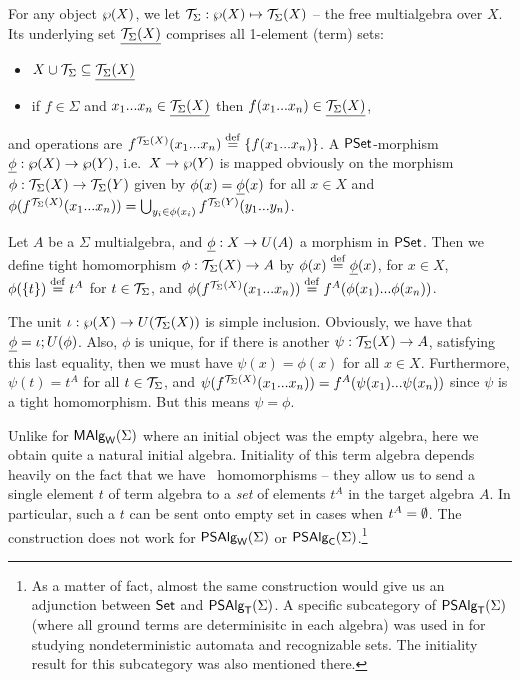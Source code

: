 \documentclass[10pt]{article}
\begin{document}
\begin{Proof}
For any object $\wp(X)$, we let ${\cal T}_{\Sigma}:\wp(X)\mapsto {\cal T}_{\Sigma}(X)$
-- the free multialgebra over $X$. Its underlying set $\underline {{\cal T}_{\Sigma}(X)}$ comprises all 1-element (term) sets:

\begin{itemize}\MyLPar
\item 
$X\cup{\cal T}_{\Sigma}\subseteq \underline {{\cal T}_{\Sigma}(X)}$ 
\item 
if $f\in\Sigma$ and $x_1...x_n\in\underline {{\cal T}_{\Sigma}(X)}$ then
$f(x_1...x_n)\in\underline {{\cal T}_{\Sigma}(X)}$,
\end{itemize}
%
and operations are $f^{{\cal T}_{\Sigma}(X)}(x_1...x_n)\stackrel{{\rm \tiny{def}}}= \{f(x_1...x_n)\}$.
A $\mbox{\rm\sf PSet}$-morphism $\underline {\phi}:\wp(X)\rightarrow\wp(Y)$, i.e.\ 
$X\rightarrow\wp(Y)$ is mapped obviously on the morphism
$\phi:{\cal T}_{\Sigma}(X)\rightarrow{\cal T}_{\Sigma}(Y)$ given by $\phi(x)=\underline {\phi}(x)$ for
all $x\in X$ and $\phi(f^{{\cal T}_{\Sigma}(X)}(x_1...x_n))=
\bigcup_{y_{i}\in\phi(x_{i})}f^{{\cal T}_{\Sigma}(Y)}(y_1...y_n)$.

Let $A$ be a $\Sigma$ multialgebra, and $\underline {\phi}:X\rightarrow U(A)$
a morphism in $\mbox{\rm\sf PSet}$. Then we define tight homomorphism $\phi
:{\cal T}_{\Sigma}(X)\rightarrow A$ by $\phi(x)\stackrel{{\rm \tiny{def}}}=\underline {\phi}(x)$, for $x\in X$,
$\phi(\{t\})\stackrel{{\rm \tiny{def}}}= t^A$ for $t\in{\cal T}_{\Sigma}$, and
$\phi(f^{{\cal T}_{\Sigma}(X)}(x_1...x_n))\stackrel{{\rm \tiny{def}}}= f^A(\phi(x_1)...\phi(x_n))$.

The unit $\iota:\wp(X)\rightarrow U({\cal T}_{\Sigma}(X))$ is simple
inclusion. Obviously, we have that $\underline {\phi} =
\iota;U(\phi)$. Also, $\phi$ is unique, for if there is
another $\psi:{\cal T}_{\Sigma}(X)\rightarrow A$, satisfying this last equality, then
we must have $\psi(x)=\phi(x)$ for all $x\in X$. Furthermore,
$\psi(t)=t^A$ for all $t\in{\cal T}_{\Sigma}$, and
$\psi(f^{{\cal T}_{\Sigma}(X)}(x_1...x_n))=f^A(\psi(x_1)...\psi(x_n))$ since
$\psi$ is a tight homomorphism. But this means $\psi=\phi$.
\end{Proof}

\noindent
Unlike for $\mbox{\rm\sf MAlg}_{\sf W}(\Sigma)$ where an initial object was the empty algebra, here
we obtain quite a natural initial algebra. Initiality of this term
algebra depends heavily on the fact that we have \PS\ homomorphisms --
they allow us to send a single element $t$ of term algebra to a {\em
set} of elements $t^A$ in the target algebra $A$. In particular, such
a $t$ can be sent onto empty set in cases when $t^A=\emptyset$.
The construction does not work for $\mbox{\sf PSAlg}_{\sf W}(\Sigma)$ or $\mbox{\sf PSAlg}_{\sf C}(\Sigma)$.\footnote{As a matter 
of fact, almost the same
construction would give us an adjunction between $\mbox{\rm\sf Set}$ and
$\mbox{\sf PSAlg}_{\sf T}(\Sigma)$. A specific subcategory of $\mbox{\sf PSAlg}_{\sf T}(\Sigma)$ (where all
ground terms are determinisitc in each algebra) was used in
\cite{eli:nondetaut} for studying nondeterministic automata and
recognizable sets. The initiality result for this subcategory was also
mentioned there.}
\end{document}
